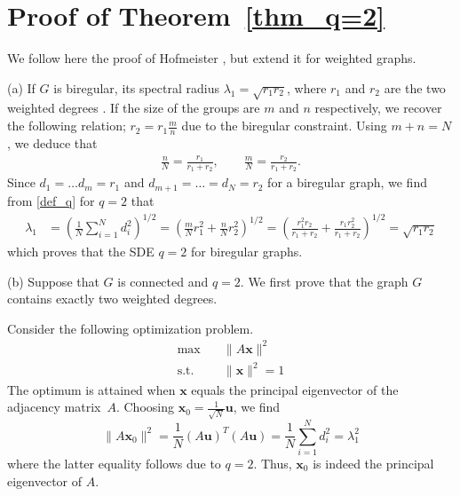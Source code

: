 \documentclass{comnet}%
\newcommand{\x}{\mathbf{x}}
\renewcommand{\u}{\mathbf{u}}
\begin{document}
%


\appendix

\section{Proof of Theorem~\ref{thm_q=2}}\label{app_proof_q2}
We follow here the proof of Hofmeister \cite{hofmeister1988spectralradius}, but extend it for weighted graphs.

(a) If $G$ is biregular, its spectral radius $\lambda_1 = \sqrt{r_1 r_2}$, where $r_1$ and $r_2$ are the two weighted degrees \cite{hofmeister1988spectralradius}. If the size of the groups are $m$ and $n$ respectively, we recover the following relation; $r_2 = r_1 \frac{m}{n}$ due to the biregular constraint. Using $m+n=N$, we deduce that
\begin{align*}
	\frac{n}{N} = \frac{r_1}{r_1 + r_2}, \qquad \frac{m}{N} = \frac{r_2}{r_1 + r_2}.
\end{align*}
Since $d_1 = \ldots d_m = r_1$ and $d_{m+1} = \ldots = d_N = r_2$ for a biregular graph, we find from \eqref{def_q} for $q=2$ that
\begin{align*}
	\lambda_1 &= \left( \frac{1}{N} \sum_{i=1}^N d_i^2 \right)^{1/2} = \left( \frac{m}{N} r_1^2 + \frac{n}{N} r_2^2 \right)^{1/2} = \left( \frac{r_1 ^2 r_2}{r_1 + r_2} + \frac{r_1 r_2^2}{r_1 + r_2} \right)^{1/2} = \sqrt{r_1 r_2}
\end{align*}
which proves that the SDE $q=2$ for biregular graphs.

(b) Suppose that $G$ is connected and $q=2$. We first prove that the graph $G$ contains exactly two weighted degrees.

Consider the following optimization problem.
\begin{equation}\label{eq_optimisation_problem}
	\begin{split}
		\max \quad &\| A \x \|^2 \\
		\text{s.t.} \quad &\|\x\|^2 = 1
	\end{split}
\end{equation}
The optimum is attained when $\x$ equals the principal eigenvector of the adjacency matrix~$A$. Choosing $\x_0 = \frac{1}{\sqrt{N}} \u$, we find
\begin{equation*}
	\| A \x_0 \|^2 = \frac{1}{N} (A \u)^T (A \u) = \frac{1}{N} \sum_{i=1}^N d_i^2 = \lambda_1^2
\end{equation*}
where the latter equality follows due to $q=2$. Thus, $\x_0$ is indeed the principal eigenvector of $A$.
\end{document}
